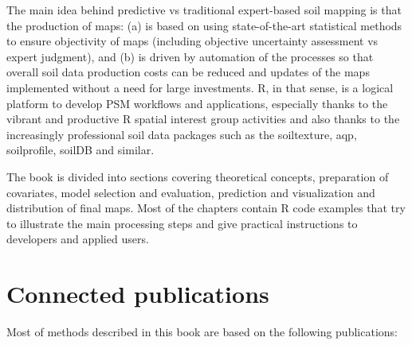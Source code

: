 \documentclass[graybox,natbib,nospthms,UStrade]{svmono}
\begin{document}
The main idea behind predictive vs traditional expert-based soil mapping is that the production of maps: (a)
is based on using state-of-the-art statistical methods to ensure objectivity of maps (including objective uncertainty assessment vs expert judgment), and (b) is driven by automation of the processes so that overall soil data production costs can be reduced and updates of the maps implemented without a need for large investments. R, in that sense, is a logical platform to develop PSM workflows and applications, especially thanks to the vibrant and productive R spatial interest group activities and also thanks to the increasingly professional soil data packages such as the soiltexture, aqp, soilprofile, soilDB and similar.

The book is divided into sections covering theoretical concepts, preparation of covariates, model selection and evaluation, prediction and visualization and distribution of final maps. Most of the chapters contain R code examples that try to illustrate the main processing steps and give practical instructions to developers and applied users.

\hypertarget{connected-publications}{%
\section*{Connected publications}\label{connected-publications}}

Most of methods described in this book are based on the following publications:
\end{document}
